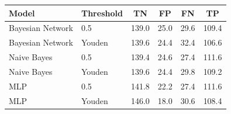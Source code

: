 \begin{tabular}{llcccc}
\toprule
Model & Threshold & TN & FP & FN & TP \\
\midrule
Bayesian Network & 0.5 & 139.0 & 25.0 & 29.6 & 109.4 \\
Bayesian Network & Youden & 139.6 & 24.4 & 32.4 & 106.6 \\
Naive Bayes & 0.5 & 139.4 & 24.6 & 27.4 & 111.6 \\
Naive Bayes & Youden & 139.6 & 24.4 & 29.8 & 109.2 \\
MLP & 0.5 & 141.8 & 22.2 & 27.4 & 111.6 \\
MLP & Youden & 146.0 & 18.0 & 30.6 & 108.4 \\
\bottomrule
\end{tabular}
